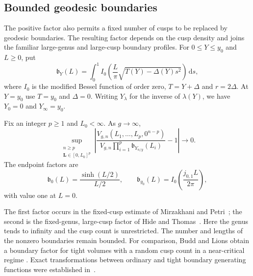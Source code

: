 \subsection{Bounded geodesic boundaries}\label{subsec:bounded-boundaries}

The positive factor also permits a fixed number of cusps to be replaced
by geodesic boundaries. The resulting factor depends on the cusp density
and joins the familiar large-genus and large-cusp boundary profiles.
For $0\le Y\le y_0$ and $L\ge0$, put
\begin{equation}
 \mathfrak b_Y(L)=\int_0^1
 I_0\!\left(\frac L\pi\sqrt{T(Y)-\Delta(Y)s^2}\right)\,\mathrm ds,
 \label{eq:boundary-profile}
\end{equation}
where $I_0$ is the modified Bessel function of order zero, $T=Y+\Delta$
and $r=2\Delta$. At $Y=y_0$ use $T=y_0$ and $\Delta=0$.
Writing $Y_\lambda$ for the inverse of $\lambda(Y)$, we have
$Y_0=0$ and $Y_\infty=y_0$.

\begin{proposition}
\label{prop:bounded-boundaries}
Fix an integer $p\ge1$ and $L_0<\infty$. As $g\to\infty$,
\begin{equation}
 \sup_{\substack{n\ge p\\\mathbf L\in[0,L_0]^p}}
 \left|
 \frac{V_{g,n}(L_1,\ldots,L_p,0^{n-p})}
 {V_{g,n}\prod_{i=1}^p\mathfrak b_{Y_{n/g}}(L_i)}-1
 \right|\longrightarrow0.
 \label{eq:boundary-uniform}
\end{equation}
The endpoint factors are
\begin{equation}
 \mathfrak b_0(L)=\frac{\sinh(L/2)}{L/2},\qquad
 \mathfrak b_{y_0}(L)=I_0\!\left(\frac{j_{0,1}L}{2\pi}\right),
 \label{eq:boundary-endpoints}
\end{equation}
with value one at $L=0$.
\end{proposition}

The first factor occurs in the fixed-cusp estimate of Mirzakhani and
Petri~\cite[Proposition~3.1]{MP}; the second is the fixed-genus,
large-cusp factor of Hide and Thomas~\cite[Theorem~1.5]{HTLargeN}.
Here the genus tends to infinity and the cusp count is unrestricted.
The number and lengths of the nonzero boundaries remain bounded.
For comparison, Budd and Lions obtain a boundary factor for tight volumes
with a random cusp count in a near-critical regime
\cite[Proposition~4.2]{BL}. Exact transformations between ordinary and
tight boundary generating functions were established in~\cite{BZ}.

